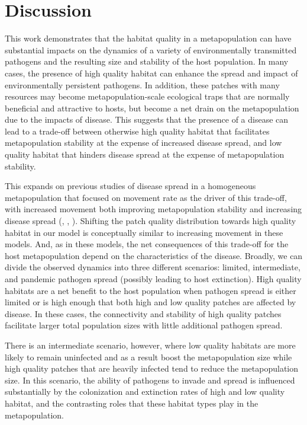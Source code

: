\documentclass{article}
\begin{document}
\section{Discussion}
\label{discussion} 

This work demonstrates that the habitat quality in a metapopulation can have substantial impacts on the dynamics of a variety of environmentally transmitted pathogens and the resulting size and stability of the host population.
In many cases, the presence of high quality habitat can enhance the spread and impact of environmentally persistent pathogens.  
In addition, these patches with many resources may become metapopulation-scale ecological traps that are normally beneficial and attractive to hosts, but become a net drain on the metapopulation due to the impacts of disease. 
This suggests that the presence of a disease can lead to a trade-off between otherwise high quality habitat that facilitates metapopulation stability at the expense of increased disease spread, and low quality habitat that hinders disease spread at the expense of metapopulation stability.

This expands on previous studies of disease spread in a homogeneous metapopulation that focused on movement rate as the driver of this trade-off, with increased movement both improving metapopulation stability and increasing disease spread (\cite{Hess1996}, \cite{Gog2002}, \cite{Park2012}).  
Shifting the patch quality distribution towards high quality habitat in our model is conceptually similar to increasing movement in these models.
And, as in these models, the net consequences of this trade-off for the host metapopulation depend on the characteristics of the disease.
Broadly, we can divide the observed dynamics into three different scenarios: limited, intermediate, and pandemic pathogen spread (possibly leading to host extinction). 
High quality habitats are a net benefit to the host population when pathogen spread is either limited or is high enough that both high and low quality patches are affected by disease. 
In these cases, the connectivity and stability of high quality patches facilitate larger total population sizes with little additional pathogen spread.

There is an intermediate scenario, however, where low quality habitats are more likely to remain uninfected and as a result boost the metapopulation size while high quality patches that are heavily infected tend to reduce the metapopulation size. 
In this scenario, the ability of pathogens to invade and spread is influenced substantially by the colonization and extinction rates of high and low quality habitat, and the contrasting roles that these habitat types play in the metapopulation.
 
\end{document}
